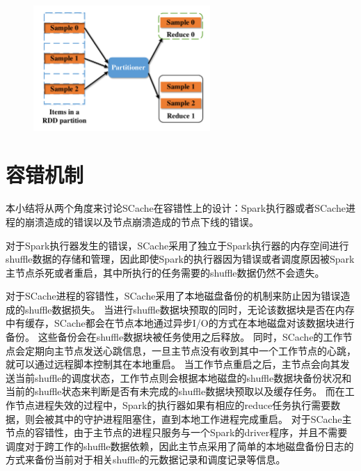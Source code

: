 \begin{figure}[!htp]
	\centering
	\includegraphics[width=0.6\textwidth]{../../PPoPP-2018/fig/sample.pdf}
\end{figure}

\section{容错机制}

本小结将从两个角度来讨论SCache在容错性上的设计：Spark执行器或者SCache进程的崩溃造成的错误以及节点崩溃造成的节点下线的错误。

对于Spark执行器发生的错误，SCache采用了独立于Spark执行器的内存空间进行shuffle数据的存储和管理，因此即使Spark的执行器因为错误或者调度原因被Spark主节点杀死或者重启，其中所执行的任务需要的shuffle数据仍然不会遗失。

对于SCache进程的容错性，SCache采用了本地磁盘备份的机制来防止因为错误造成的shuffle数据损失。
当进行shuffle数据块预取的同时，无论该数据块是否在内存中有缓存，SCache都会在节点本地通过异步I/O的方式在本地磁盘对该数据块进行备份。
这些备份会在shuffle数据块被任务使用之后释放。
同时，SCache的工作节点会定期向主节点发送心跳信息，一旦主节点没有收到其中一个工作节点的心跳，就可以通过远程脚本控制其在本地重启。
当工作节点重启之后，主节点会向其发送当前shuffle的调度状态，工作节点则会根据本地磁盘的shuffle数据块备份状况和当前的shuffle状态来判断是否有未完成的shuffle数据块预取以及缓存任务。
而在工作节点进程失效的过程中，Spark的执行器如果有相应的reduce任务执行需要数据，则会被其中的守护进程阻塞住，直到本地工作进程完成重启。
对于SCache主节点的容错性，由于主节点的进程只服务与一个Spark的driver程序，并且不需要调度对于跨工作的shuffle数据依赖，因此主节点采用了简单的本地磁盘备份日志的方式来备份当前对于相关shuffle的元数据记录和调度记录等信息。

